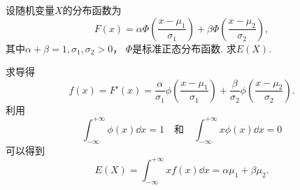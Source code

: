 \begin{example}
设随机变量\(X\)的分布函数为\begin{equation*}
	F(x) = \alpha \Phi\left( \frac{x-\mu_1}{\sigma_1} \right)
	+ \beta \Phi\left( \frac{x-\mu_2}{\sigma_2} \right),
\end{equation*}
其中\(\alpha+\beta=1,
\sigma_1,\sigma_2>0\)，
\(\Phi\)是标准正态分布函数.
求\(E(X)\).
\begin{solution}
求导得\begin{equation*}
	f(x) = F'(x)
	= \frac{\alpha}{\sigma_1} \phi\left( \frac{x-\mu_1}{\sigma_1} \right)
	+ \frac{\beta}{\sigma_2} \phi\left( \frac{x-\mu_2}{\sigma_2} \right).
\end{equation*}
利用\begin{equation*}
	\int_{-\infty}^{+\infty} \phi(x) \dd{x} = 1
	\quad\text{和}\quad
	\int_{-\infty}^{+\infty} x \phi(x) \dd{x} = 0
\end{equation*}
可以得到\begin{equation*}
	E(X) = \int_{-\infty}^{+\infty} x f(x) \dd{x}
	= \alpha \mu_1 + \beta \mu_2.
\end{equation*}
\end{solution}
\end{example}
